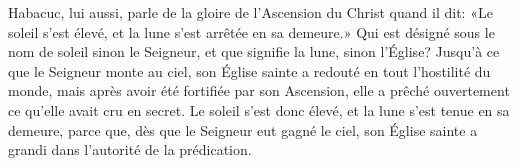Habacuc, lui aussi, parle de la gloire de l’Ascension du Christ quand il dit:
	«Le soleil s’est élevé, et la lune s’est arrêtée en sa demeure.»
Qui est désigné sous le nom de soleil sinon le Seigneur,
	et que signifie la lune, sinon l’Église?
Jusqu’à ce que le Seigneur monte au ciel,
	son Église sainte a redouté en tout l’hostilité du monde,
	mais après avoir été fortifiée par son Ascension,
	elle a prêché ouvertement ce qu’elle avait cru en secret.
Le soleil s’est donc élevé, et la lune s’est tenue en sa demeure,
	parce que, dès que le Seigneur eut gagné le ciel,
	son Église sainte a grandi dans l’autorité de la prédication.
